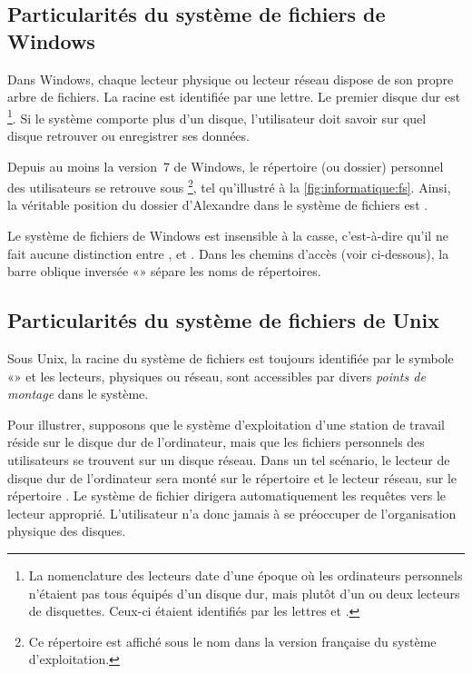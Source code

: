 \subsection{Particularités du système de fichiers de Windows}
\label{sec:informatique:fs:windows}

Dans Windows, chaque lecteur physique ou lecteur réseau dispose de son
propre arbre de fichiers. La racine est identifiée par une lettre. Le
premier disque dur est \footnote{%
  La nomenclature des lecteurs date d'une époque où les ordinateurs
  personnels n'étaient pas tous équipés d'un disque dur, mais plutôt
  d'un ou deux lecteurs de disquettes. Ceux-ci étaient identifiés par
  les lettres  et .}. %
Si le système comporte plus d'un disque, l'utilisateur doit savoir sur
quel disque retrouver ou enregistrer ses données.

Depuis au moins la version~7 de Windows, le répertoire (ou dossier)
personnel des utilisateurs se retrouve sous
\footnote{%
  Ce répertoire est affiché sous le nom  dans la
  version française du système d'exploitation.}, %
tel qu'illustré à la \autoref{fig:informatique:fs}. Ainsi, la
véritable position du dossier  d'Alexandre dans le
système de fichiers est .

Le système de fichiers de Windows est insensible à la casse,
c'est-à-dire qu'il ne fait aucune distinction entre ,  et . Dans les
chemins d'accès (voir ci-dessous), la barre oblique inversée
«{\bs}» sépare les noms de répertoires.


\subsection{Particularités du système de fichiers de Unix}
\label{sec:informatique:fs:unix}

Sous Unix, la racine du système de fichiers est toujours
identifiée par le symbole «\code{/}» et les lecteurs, physiques ou
réseau, sont accessibles par divers \emph{points de montage} dans le
système.

Pour illustrer, supposons que le système d'exploitation d'une station
de travail réside sur le disque dur de l'ordinateur, mais que les
fichiers personnels des utilisateurs se trouvent sur un disque réseau.
Dans un tel scénario, le lecteur de disque dur de l'ordinateur sera
monté sur le répertoire \code{/} et le lecteur réseau, sur le
répertoire . Le système de fichier dirigera
automatiquement les requêtes vers le lecteur approprié. L'utilisateur
n'a donc jamais à se préoccuper de l'organisation physique des
disques.

